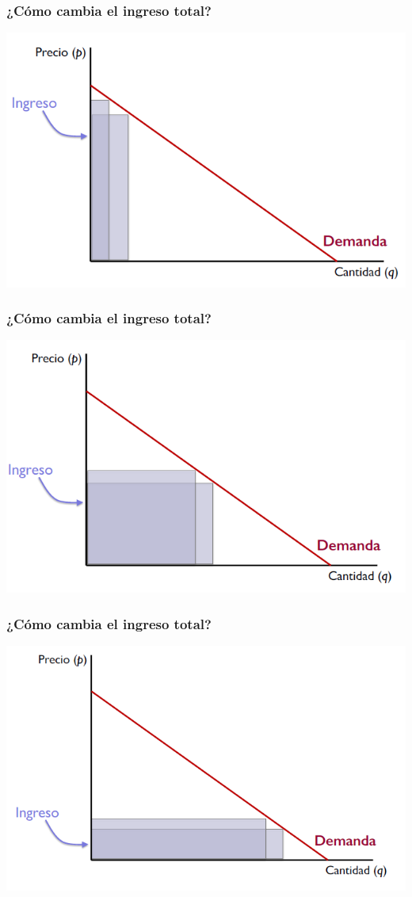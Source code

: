 \documentclass{beamer}
\begin{document}
\begin{frame}
\frametitle{¿Cómo cambia el ingreso total?}
\includegraphics[scale=0.6]{Slides Principios de Economia/Figures/Tema_06.30_ingresototal.png}
\end{frame}

\begin{frame}
\frametitle{¿Cómo cambia el ingreso total?}
\includegraphics[scale=0.6]{Slides Principios de Economia/Figures/Tema_06.31_ingresototal2.png}
\end{frame}

\begin{frame}
\frametitle{¿Cómo cambia el ingreso total?}
\includegraphics[scale=0.6]{Slides Principios de Economia/Figures/Tema_06.32_ingresototal3.png}
\end{frame}
\end{document}
